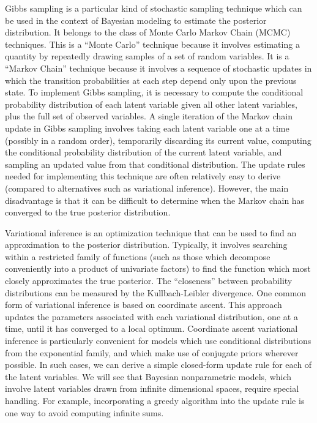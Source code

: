 \documentclass{article}
\begin{document}
Gibbs sampling is a particular kind of stochastic sampling technique which can be used in the context of Bayesian modeling to estimate the posterior distribution.
It belongs to the class of Monte Carlo Markov Chain (MCMC) techniques.
This is a ``Monte Carlo'' technique because it involves estimating a quantity by repeatedly drawing samples of a set of random variables.
It is a ``Markov Chain'' technique because it involves a sequence of stochastic updates in which the transition probabilities at each step depend only upon the previous state.
To implement Gibbs sampling, it is necessary to compute the conditional probability distribution of each latent variable given all other latent variables, plus the full set of observed variables.
A single iteration of the Markov chain update in Gibbs sampling involves taking each latent variable one at a time (possibly in a random order), temporarily discarding its current value, computing the conditional probability distribution of the current latent variable, and sampling an updated value from that conditional distribution.
The update rules needed for implementing this technique are often relatively easy to derive (compared to alternatives such as variational inference).
However, the main disadvantage is that it can be difficult to determine when the Markov chain has converged to the true posterior distribution.

Variational inference is an optimization technique that can be used to find an approximation to the posterior distribution.
Typically, it involves searching within a restricted family of functions (such as those which decompose conveniently into a product of univariate factors) to find the function which most closely approximates the true posterior.
The ``closeness'' between probability distributions can be measured by the Kullbach-Leibler divergence.
One common form of variational inference is based on coordinate ascent.
This approach updates the parameters associated with each variational distribution, one at a time, until it has converged to a local optimum.
Coordinate ascent variational inference is particularly convenient for models which use conditional distributions from the exponential family, and which make use of conjugate priors wherever possible.
In such cases, we can derive a simple closed-form update rule for each of the latent variables.
We will see that Bayesian nonparametric models, which involve latent variables drawn from infinite dimensional spaces, require special handling.
For example, incorporating a greedy algorithm into the update rule is one way to avoid computing infinite sums.
\end{document}
